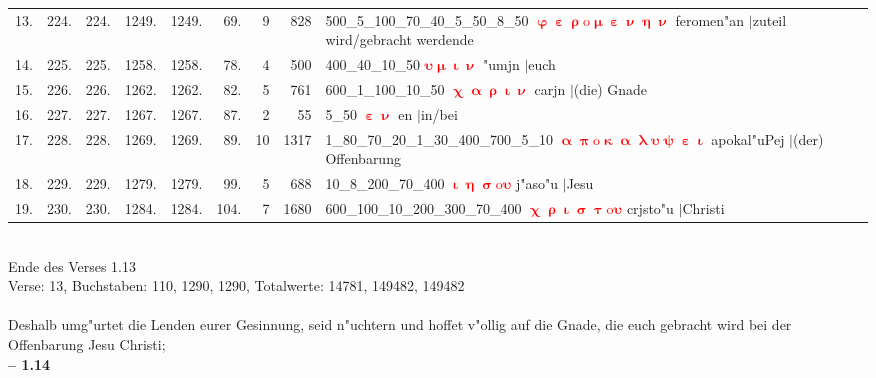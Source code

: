 \documentclass[a4paper,10pt,landscape]{article}
\begin{document}
\begin{tabular}{rrrrrrrrp{120mm}}
13.&224.&224.&1249.&1249.&69.&9&828&500\_5\_100\_70\_40\_5\_50\_8\_50 \textcolor{red}{$\boldsymbol{\upvarphi\upepsilon\uprho\mathrm{o}\upmu\upepsilon\upnu\upeta\upnu}$} feromen"an $|$zuteil wird/gebracht werdende\\
14.&225.&225.&1258.&1258.&78.&4&500&400\_40\_10\_50 \textcolor{red}{$\boldsymbol{\upsilon\upmu\upiota\upnu}$} "umjn $|$euch\\
15.&226.&226.&1262.&1262.&82.&5&761&600\_1\_100\_10\_50 \textcolor{red}{$\boldsymbol{\upchi\upalpha\uprho\upiota\upnu}$} carjn $|$(die) Gnade\\
16.&227.&227.&1267.&1267.&87.&2&55&5\_50 \textcolor{red}{$\boldsymbol{\upepsilon\upnu}$} en $|$in/bei\\
17.&228.&228.&1269.&1269.&89.&10&1317&1\_80\_70\_20\_1\_30\_400\_700\_5\_10 \textcolor{red}{$\boldsymbol{\upalpha\uppi\mathrm{o}\upkappa\upalpha\uplambda\upsilon\uppsi\upepsilon\upiota}$} apokal"uPej $|$(der) Offenbarung\\
18.&229.&229.&1279.&1279.&99.&5&688&10\_8\_200\_70\_400 \textcolor{red}{$\boldsymbol{\upiota\upeta\upsigma\mathrm{o}\upsilon}$} j"aso"u $|$Jesu\\
19.&230.&230.&1284.&1284.&104.&7&1680&600\_100\_10\_200\_300\_70\_400 \textcolor{red}{$\boldsymbol{\upchi\uprho\upiota\upsigma\uptau\mathrm{o}\upsilon}$} crjsto"u $|$Christi\\
\end{tabular}\medskip \\
Ende des Verses 1.13\\
Verse: 13, Buchstaben: 110, 1290, 1290, Totalwerte: 14781, 149482, 149482\\
\\
Deshalb umg"urtet die Lenden eurer Gesinnung, seid n"uchtern und hoffet v"ollig auf die Gnade, die euch gebracht wird bei der Offenbarung Jesu Christi;\\
\newpage 
{\bf -- 1.14}\\
\medskip \\
\end{document}
